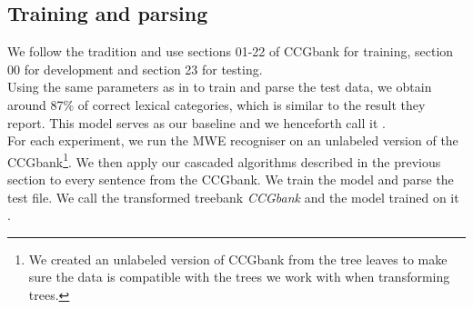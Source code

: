 \documentclass[output=paper]{langsci/langscibook}
\begin{document}
    \subsection{Training and parsing}
    \label{del:trainparse}
    \indent We follow the tradition and use sections 01-22 of CCGbank for training, section 00 for development and section 23 for testing.\\
    \indent Using the same parameters as in \citet{deoskar} to train and parse the test data, we obtain around 87\% of correct lexical categories, which is similar to the result they report. This model serves as our baseline and we henceforth call it {\modelA}.\\
    \indent For each experiment, we run the MWE recogniser on an unlabeled version of the CCGbank\footnote{We created an unlabeled version of CCGbank from the tree leaves to make sure the data is compatible with the trees we work with when transforming trees.}. We then apply our cascaded algorithms described in the previous section to every sentence from the CCGbank. We train the model and parse the test file. We call the transformed treebank \textit{CCGbank} and the model trained on it {\modelB}.
\end{document}
